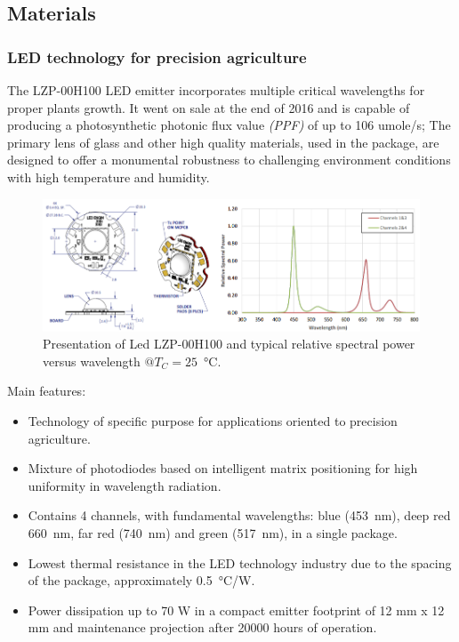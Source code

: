 \documentclass[letterpaper,12pt,twoside]{articleingud}
\begin{document}
\subsection{Materials}
\subsubsection{LED technology for precision agriculture}
The LZP-00H100 LED emitter incorporates multiple critical wavelengths for proper plants growth. It went on sale at the end of 2016 and is capable of producing a photosynthetic photonic flux value \textit{(PPF)} of up to 106 umole/s; The primary lens of glass and other high quality materials, used in the package, are designed to offer a monumental robustness to challenging environment conditions with high temperature and humidity.
\begin{figure}
 \begin{center}
  \includegraphics[width=16cm]{images/ledEngine.png}
   \caption{Presentation of Led LZP-00H100 and typical relative spectral power versus wavelength $@T_C = 25$~\si{\degreeCelsius}.\cite{ledEngine} }
  \end{center}
\end{figure}
Main features:
\begin{itemize}
    \item Technology of specific purpose for applications oriented to precision agriculture.
    \item Mixture of photodiodes based on intelligent matrix positioning for high uniformity in wavelength radiation.
    \item Contains 4 channels, with fundamental wavelengths: blue \text(\SI{453}{\nano\metre}), deep red \SI{660}{\nano\metre}, far red \text(\SI{740}{\nano\metre}) and green \text(\SI{517}{\nano\metre}), in a single package.
    \item Lowest thermal resistance in the LED technology industry due to the spacing of the package, approximately \SI{0.5}{\degreeCelsius/\watt}.
    \item Power dissipation up to 70 W in a compact emitter footprint of 12 mm x 12 mm and maintenance projection after 20000 hours of operation.
\end{itemize}
\end{document}
